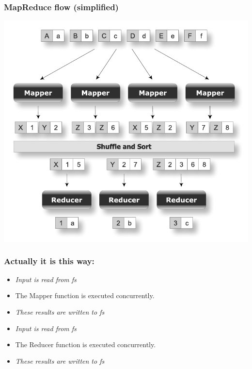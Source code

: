 \begin{frame}
\frametitle{MapReduce flow (simplified)}
\begin{center}
\includegraphics[scale=0.6,keepaspectratio=true]{figs/12/mapreduce_flow.pdf}
\end{center}

\end{frame}

\begin{frame}
\frametitle{Actually it is this way:}
\begin{itemize}
\item {\it Input is read from fs}
\item The Mapper function is executed concurrently.
\item {\it These results are written to fs}
\item {\it Input is read from fs}
\item The Reducer function is executed concurrently.
\item {\it These results are written to fs}
\end{itemize}
\end{frame}

